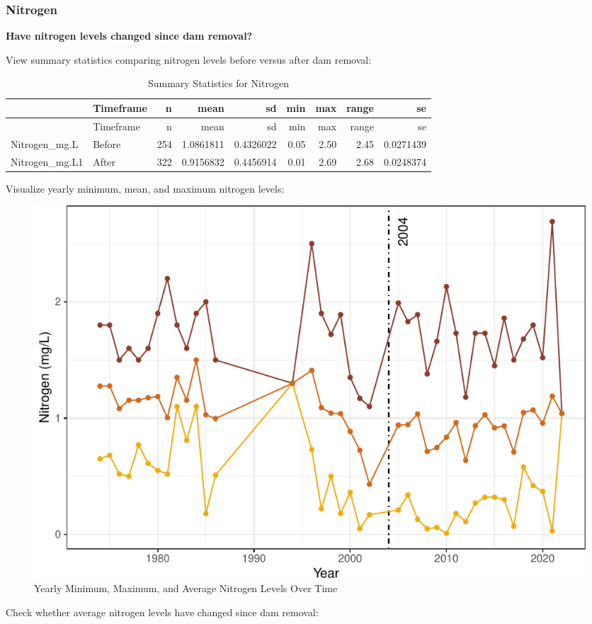 \documentclass[
  12pt,
]{article}
\begin{document}
\newpage

\hypertarget{nitrogen}{%
\subsubsection{Nitrogen}\label{nitrogen}}

\textbf{Have nitrogen levels changed since dam removal?}

View summary statistics comparing nitrogen levels before versus after
dam removal:

\begin{longtable}[]{@{}llrrrrrrr@{}}
\caption{Summary Statistics for Nitrogen}\tabularnewline
\toprule
& Timeframe & n & mean & sd & min & max & range & se \\
\midrule
\endfirsthead
\toprule
& Timeframe & n & mean & sd & min & max & range & se \\
\midrule
\endhead
Nitrogen\_mg.L & Before & 254 & 1.0861811 & 0.4326022 & 0.05 & 2.50 &
2.45 & 0.0271439 \\
Nitrogen\_mg.L1 & After & 322 & 0.9156832 & 0.4456914 & 0.01 & 2.69 &
2.68 & 0.0248374 \\
\bottomrule
\end{longtable}

Visualize yearly minimum, mean, and maximum nitrogen levels:

\begin{figure}
\centering
\includegraphics{Project_Script_files/figure-latex/Nitrogen_Analysis3-1.pdf}
\caption{Yearly Minimum, Maximum, and Average Nitrogen Levels Over Time}
\end{figure}

Check whether average nitrogen levels have changed since dam removal:
\end{document}
